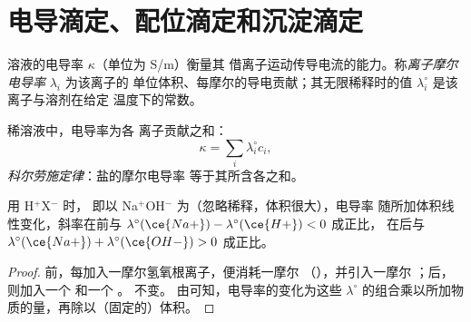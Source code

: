 \section{电导滴定、配位滴定和沉淀滴定}

\begin{definition}[离子摩尔电导率]\label{def:b1:titration-methods:conductivity}
溶液的电导率 $\kappa$（单位为 \unit{S/m}）衡量其
借离子运动传导电流的能力。称\emph{离子摩尔
电导率} $\lambda_i$ 为该离子的
单位体积、每摩尔的导电贡献；其无限稀释时的值
$\lambda_i^\circ$ 是该离子与溶剂在给定
温度下的常数。
\end{definition}

\begin{proposition}[科尔劳施定律]\label{prop:b1:titration-methods:kohlrausch}
稀溶液中，电导率为各
离子贡献之和：
\[
  \kappa = \sum_i \lambda_i^\circ c_i ,
\]
\emph{科尔劳施定律}：盐的摩尔电导率
等于其所含各之和。
\end{proposition}


\begin{proposition}[电导滴定的斜率]\label{prop:b1:titration-methods:conductimetric-slopes}
用 H$^+$X$^-$ 时，
即以 Na$^+$OH$^-$ 为（忽略稀释，体积很大），电导率
随所加体积线性变化，斜率在前与
$\lambda^\circ(\ce{Na+}) - \lambda^\circ(\ce{H+}) < 0$ 成正比，
在后与 $\lambda^\circ(\ce{Na+}) + \lambda^\circ(\ce{OH-}) > 0$
成正比。
\end{proposition}

\begin{proof}
前，每加入一摩尔氢氧根离子，便消耗一摩尔
（），并引入一摩尔 ；后，
则加入一个  和一个 。 不变。
由可知，电导率的变化为这些
$\lambda^\circ$ 的组合乘以所加物质的量，再除以（固定的）体积。
\end{proof}

